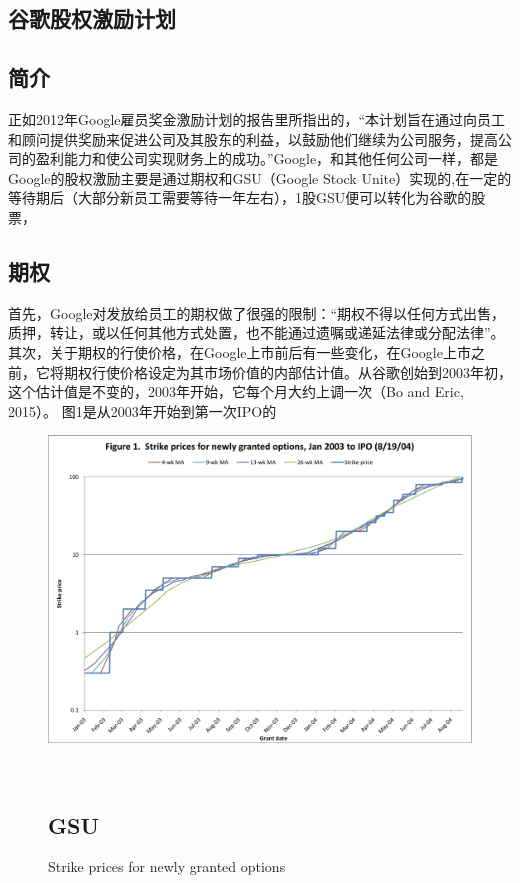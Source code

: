 \documentclass{article}
\begin{document}
\begin{CJK}{UTF8}{gbsn}
\section{谷歌股权激励计划}
\subsection{简介}
正如2012年Google雇员奖金激励计划的报告里所指出的，“本计划旨在通过向员工和顾问提供奖励来促进公司及其股东的利益，以鼓励他们继续为公司服务，提高公司的盈利能力和使公司实现财务上的成功。”Google，和其他任何公司一样，都是
Google的股权激励主要是通过期权和GSU（Google Stock Unite）实现的,在一定的等待期后（大部分新员工需要等待一年左右），1股GSU便可以转化为谷歌的股票，
\subsection{期权}
首先，Google对发放给员工的期权做了很强的限制：“期权不得以任何方式出售，质押，转让，或以任何其他方式处置，也不能通过遗嘱或递延法律或分配法律”。\\
其次，关于期权的行使价格，在Google上市前后有一些变化，在Google上市之前，它将期权行使价格设定为其市场价值的内部估计值。从谷歌创始到2003年初，这个估计值是不变的，2003年开始，它每个月大约上调一次（Bo and Eric, 2015）。
图1是从2003年开始到第一次IPO的\\
 \begin{figure}
  \centering
  \includegraphics[width=1\textwidth]{1.png} 
  \caption{Strike prices for newly granted options} 
  \label{img}
 \\
\subsection{GSU}
\end{figure}
\end{CJK}
\end{document}
